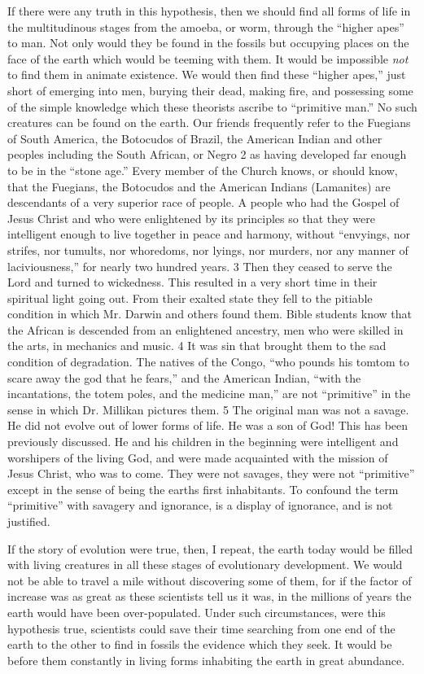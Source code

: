 If there were any truth in this hypothesis, then we should find all forms of life in the
multitudinous stages from the amoeba, or worm, through the ``higher apes'' to man. Not only
would they be found in the fossils but occupying places on the face of the earth which would
be teeming with them. It would be impossible \textit{not} to find them in animate existence. We
would then find these ``higher apes,'' just short of emerging into men, burying their dead,
making fire, and possessing some of the simple knowledge which these theorists ascribe to
``primitive man.'' No such creatures can be found on the earth. Our friends frequently refer to
the Fuegians of South America, the Botocudos of Brazil, the American Indian and other
peoples including the South African, or Negro 2 as having developed far enough to be in the
``stone age.'' Every member of the Church knows, or should know, that the Fuegians, the
Botocudos and the American Indians (Lamanites) are descendants of a very superior race of
people. A people who had the Gospel of Jesus Christ and who were enlightened by its
principles so that they were intelligent enough to live together in peace and harmony, without
``envyings, nor strifes, nor tumults, nor whoredoms, nor lyings, nor murders, nor any manner
of laciviousness,'' for nearly two hundred years. 3 Then they ceased to serve the Lord and
turned to wickedness. This resulted in a very short time in their spiritual light going out.
From their exalted state they fell to the pitiable condition in which Mr. Darwin and others
found them. Bible students know that the African is descended from an enlightened ancestry,
men who were skilled in the arts, in mechanics and music. 4 It was sin that brought them to
the sad condition of degradation. The natives of the Congo, ``who pounds his tomtom to scare
away the god that he fears,'' and the American Indian, ``with the incantations, the totem poles,
and the medicine man,'' are not ``primitive'' in the sense in which Dr. Millikan pictures them.
5 The original man was not a savage. He did not evolve out of lower forms of life. He was a
son of God! This has been previously discussed. He and his children in the beginning were
intelligent and worshipers of the living God, and were made acquainted with the mission of
Jesus Christ, who was to come. They were not savages, they were not ``primitive'' except in
the sense of being the earths first inhabitants. To confound the term ``primitive'' with
savagery and ignorance, is a display of ignorance, and is not justified.

If the story of evolution were true, then, I repeat, the earth today would be filled with living
creatures in all these stages of evolutionary development. We would not be able to travel a
mile without discovering some of them, for if the factor of increase was as great as these
scientists tell us it was, in the millions of years the earth would have been over-populated.
Under such circumstances, were this hypothesis true, scientists could save their time
searching from one end of the earth to the other to find in fossils the evidence which they
seek. It would be before them constantly in living forms inhabiting the earth in great
abundance.

